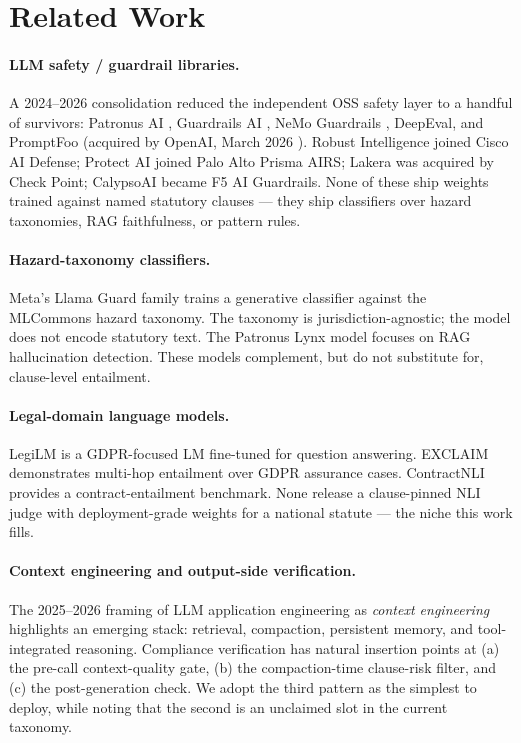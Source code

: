 \documentclass[11pt]{article}
\begin{document}
\section{Related Work}
\label{sec:related}

\paragraph{LLM safety / guardrail libraries.} A 2024--2026 consolidation reduced the independent OSS safety layer to a handful of survivors: Patronus AI \cite{patronus-lynx}, Guardrails AI \cite{guardrails-ai}, NeMo Guardrails \cite{nemo-guardrails}, DeepEval, and PromptFoo (acquired by OpenAI, March 2026 \cite{promptfoo-acquisition}). Robust Intelligence joined Cisco AI Defense; Protect AI joined Palo Alto Prisma AIRS; Lakera was acquired by Check Point; CalypsoAI became F5 AI Guardrails. None of these ship weights trained against named statutory clauses --- they ship classifiers over hazard taxonomies, RAG faithfulness, or pattern rules.

\paragraph{Hazard-taxonomy classifiers.} Meta's Llama Guard family \cite{llama-guard} trains a generative classifier against the MLCommons hazard taxonomy. The taxonomy is jurisdiction-agnostic; the model does not encode statutory text. The Patronus Lynx model \cite{patronus-lynx} focuses on RAG hallucination detection. These models complement, but do not substitute for, clause-level entailment.

\paragraph{Legal-domain language models.} LegiLM \cite{legilm} is a GDPR-focused LM fine-tuned for question answering. EXCLAIM \cite{exclaim} demonstrates multi-hop entailment over GDPR assurance cases. ContractNLI \cite{contract-nli} provides a contract-entailment benchmark. None release a clause-pinned NLI judge with deployment-grade weights for a national statute --- the niche this work fills.

\paragraph{Context engineering and output-side verification.} The 2025--2026 framing of LLM application engineering as \emph{context engineering} \cite{karpathy-context, anthropic-context, mei-survey} highlights an emerging stack: retrieval, compaction, persistent memory, and tool-integrated reasoning. Compliance verification has natural insertion points at (a) the pre-call context-quality gate, (b) the compaction-time clause-risk filter, and (c) the post-generation check. We adopt the third pattern as the simplest to deploy, while noting that the second is an unclaimed slot in the current taxonomy.
\end{document}
